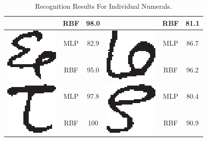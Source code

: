 \begin{table}[h]
\begin{tabular}{|c|c|c|c|c|c|}
\cline{2-3} \cline{5-6}
 & RBF & 98.0 &  & RBF & 81.1\tabularnewline
\hline
\multirow{2}{*}{\includegraphics[scale=0.25]{figures/datasets/nhcr/numerals/six}} & MLP & 82.9 & \multirow{2}{*}{\includegraphics[scale=0.25]{figures/datasets/nhcr/numerals/seven}} & MLP & 86.7\tabularnewline
\cline{2-3} \cline{5-6}
 & RBF & 95.0 &  & RBF & 96.2\tabularnewline
\hline
\multirow{2}{*}{\includegraphics[scale=0.25]{figures/datasets/nhcr/numerals/eight}} & MLP & 97.8 & \multirow{2}{*}{\includegraphics[scale=0.25]{figures/datasets/nhcr/numerals/nine}} & MLP & 80.4\tabularnewline
\cline{2-3} \cline{5-6}
 & RBF & 100 &  & RBF & 90.9\tabularnewline
\hline
\end{tabular}
\caption{Recognition Results For Individual Numerals.}
\label{table_recognition_result_for_individual_numerals}
\end{table}

